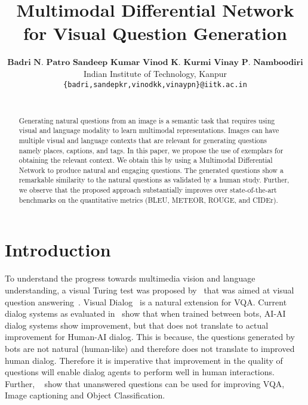 \documentclass[11pt,a4paper]{article}
\title{Multimodal Differential Network for Visual Question Generation}
\author{ $\textbf{Badri N. Patro}$  \quad $\textbf{Sandeep Kumar}$ \quad $\textbf{Vinod K. Kurmi} $ \quad  $\textbf{Vinay P. Namboodiri}$ \\
  Indian Institute of Technology, Kanpur \\
{\tt \{badri,sandepkr,vinodkk,vinaypn\}@iitk.ac.in} \\
\\}
\date{}
\begin{document}
\maketitle



\begin{abstract}

Generating natural questions from an image is a semantic task that requires using visual and language modality to learn multimodal representations. Images can have multiple visual and language contexts that are relevant for generating questions namely places, captions, and tags. In this paper, we propose the use of exemplars for obtaining the relevant context.
We obtain this by using a Multimodal Differential Network to produce natural and engaging questions. The generated questions show a remarkable similarity to the natural questions as validated by a human study. 
Further, we observe that the proposed approach substantially improves over state-of-the-art benchmarks on the quantitative metrics (BLEU, METEOR, ROUGE, and CIDEr).

\end{abstract}


\section{Introduction}\label{intro}
To understand the progress towards multimedia vision and language understanding, 
a visual Turing test was proposed by~\cite{Geman_PNAS2015} that was aimed at visual question answering~\cite{VQA}. Visual Dialog~\cite{visdial} is a natural extension for VQA. Current dialog systems as evaluated in~\cite{visdial_eval} show that when trained between bots, AI-AI dialog systems show improvement, but that does not translate to actual improvement for Human-AI dialog. This is because, the questions generated by bots are not natural (human-like) and therefore does not translate to improved human dialog. Therefore it is imperative that improvement in the quality of questions will enable dialog agents to perform well in human interactions. Further, ~\cite{GanjuCVPR17} show that unanswered questions can be used for improving VQA, Image captioning and Object Classification. 
\end{document}
